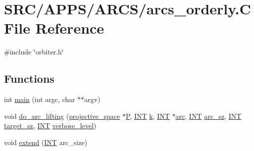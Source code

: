 \hypertarget{arcs__orderly_8_c}{}\section{S\+R\+C/\+A\+P\+P\+S/\+A\+R\+C\+S/arcs\+\_\+orderly.C File Reference}
\label{arcs__orderly_8_c}
{\ttfamily \#include \char`\"{}orbiter.\+h\char`\"{}}\newline
\subsection*{Functions}
\begin{DoxyCompactItemize}
\item 
int \mbox{\hyperlink{arcs__orderly_8_c_a3c04138a5bfe5d72780bb7e82a18e627}{main}} (int argc, char $\ast$$\ast$argv)
\item 
void \mbox{\hyperlink{arcs__orderly_8_c_a7367bc544c290322bdbd4545388a27a8}{do\+\_\+arc\+\_\+lifting}} (\mbox{\hyperlink{classprojective__space}{projective\+\_\+space}} $\ast$\mbox{\hyperlink{simeon_8_c_a7fa15551e800919e93401fbbcd8e71e8}{P}}, \mbox{\hyperlink{galois_8h_a09fddde158a3a20bd2dcadb609de11dc}{I\+NT}} \mbox{\hyperlink{simeon_8_c_a43fa990200c3ddd47c35f151bd4d66bf}{k}}, \mbox{\hyperlink{galois_8h_a09fddde158a3a20bd2dcadb609de11dc}{I\+NT}} $\ast$\mbox{\hyperlink{k__arc__lifting_8_c_a50a2f1deaa1f2221d24fb08f6393c733}{arc}}, \mbox{\hyperlink{galois_8h_a09fddde158a3a20bd2dcadb609de11dc}{I\+NT}} \mbox{\hyperlink{k__arc__lifting_8_c_a7b4d89f7a9c5ed0e6c0b9cdfb47b3c95}{arc\+\_\+sz}}, \mbox{\hyperlink{galois_8h_a09fddde158a3a20bd2dcadb609de11dc}{I\+NT}} \mbox{\hyperlink{arcs__orderly_8_c_a026af034cfbbae0993242127feb33d5d}{target\+\_\+sz}}, \mbox{\hyperlink{galois_8h_a09fddde158a3a20bd2dcadb609de11dc}{I\+NT}} \mbox{\hyperlink{simeon_8_c_a818073fbcc2f439e7c56952f67386122}{verbose\+\_\+level}})
\item 
void \mbox{\hyperlink{arcs__orderly_8_c_addc6404f0f11185218b39a9df0e7a293}{extend}} (\mbox{\hyperlink{galois_8h_a09fddde158a3a20bd2dcadb609de11dc}{I\+NT}} arc\+\_\+size)
\end{DoxyCompactItemize}
